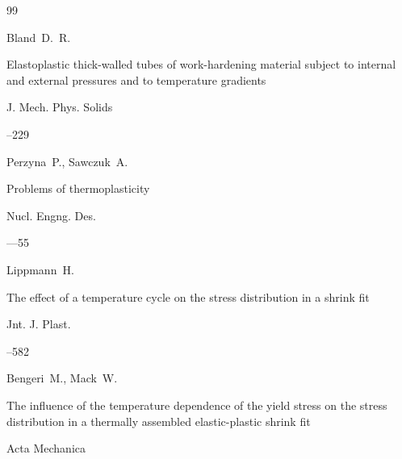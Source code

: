 \begin{thebibliography}{99}




\by Bland~D.~R.

\paper Elastoplastic thick-walled tubes of work-hardening material subject to internal and external pressures and to temperature gradients

\jour J. Mech. Phys. Solids




--229







\by Perzyna~P., Sawczuk~A.

\paper Problems of thermoplasticity

\jour Nucl. Engng. Des.




—55







\by Lippmann~H.

\paper The effect of a temperature cycle on the stress distribution in a shrink fit

\jour Jnt. J. Plast.




--582







\by Bengeri~M., Mack~W. 

\paper The influence of the temperature dependence of the yield stress on the stress distribution in a thermally assembled elastic-plastic shrink fit

\jour Acta Mechanica


\end{thebibliography}
